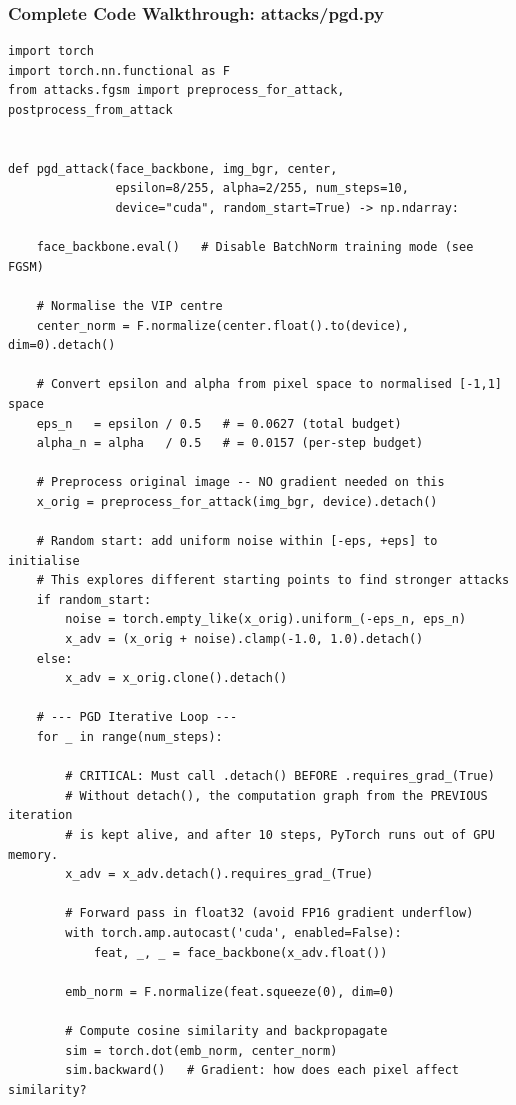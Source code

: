 \documentclass[12pt,a4paper]{article}
\begin{document}
\subsubsection{Complete Code Walkthrough: attacks/pgd.py}

\begin{lstlisting}[caption={attacks/pgd.py -- Complete listing with line-by-line explanation}]
import torch
import torch.nn.functional as F
from attacks.fgsm import preprocess_for_attack, postprocess_from_attack


def pgd_attack(face_backbone, img_bgr, center,
               epsilon=8/255, alpha=2/255, num_steps=10,
               device="cuda", random_start=True) -> np.ndarray:

    face_backbone.eval()   # Disable BatchNorm training mode (see FGSM)

    # Normalise the VIP centre
    center_norm = F.normalize(center.float().to(device), dim=0).detach()

    # Convert epsilon and alpha from pixel space to normalised [-1,1] space
    eps_n   = epsilon / 0.5   # = 0.0627 (total budget)
    alpha_n = alpha   / 0.5   # = 0.0157 (per-step budget)

    # Preprocess original image -- NO gradient needed on this
    x_orig = preprocess_for_attack(img_bgr, device).detach()

    # Random start: add uniform noise within [-eps, +eps] to initialise
    # This explores different starting points to find stronger attacks
    if random_start:
        noise = torch.empty_like(x_orig).uniform_(-eps_n, eps_n)
        x_adv = (x_orig + noise).clamp(-1.0, 1.0).detach()
    else:
        x_adv = x_orig.clone().detach()

    # --- PGD Iterative Loop ---
    for _ in range(num_steps):

        # CRITICAL: Must call .detach() BEFORE .requires_grad_(True)
        # Without detach(), the computation graph from the PREVIOUS iteration
        # is kept alive, and after 10 steps, PyTorch runs out of GPU memory.
        x_adv = x_adv.detach().requires_grad_(True)

        # Forward pass in float32 (avoid FP16 gradient underflow)
        with torch.amp.autocast('cuda', enabled=False):
            feat, _, _ = face_backbone(x_adv.float())

        emb_norm = F.normalize(feat.squeeze(0), dim=0)

        # Compute cosine similarity and backpropagate
        sim = torch.dot(emb_norm, center_norm)
        sim.backward()   # Gradient: how does each pixel affect similarity?


\end{lstlisting}
\end{document}
